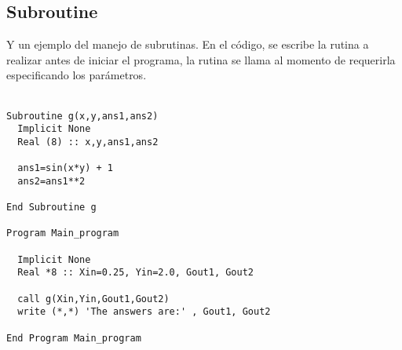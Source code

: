 \documentclass{article}
\begin{document}
\subsection*{Subroutine}
Y un ejemplo del manejo de subrutinas. En el c\'odigo, se escribe la rutina a realizar antes de iniciar el programa, la rutina se llama al momento de requerirla especificando los par\'ametros.\\ \\


	
\begin{Verbatim}[frame=single]
Subroutine g(x,y,ans1,ans2)
  Implicit None
  Real (8) :: x,y,ans1,ans2

  ans1=sin(x*y) + 1 
  ans2=ans1**2

End Subroutine g

Program Main_program

  Implicit None
  Real *8 :: Xin=0.25, Yin=2.0, Gout1, Gout2

  call g(Xin,Yin,Gout1,Gout2)
  write (*,*) 'The answers are:' , Gout1, Gout2

End Program Main_program
\end{Verbatim}
\end{document}
